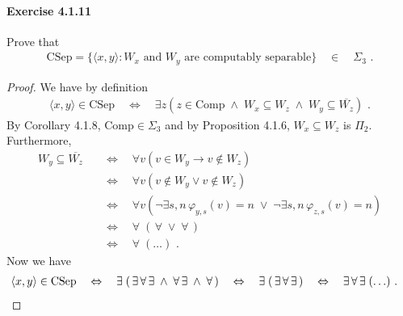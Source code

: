 \documentclass[a4paper,11pt]{article}
\begin{document}
\paragraph{Exercise 4.1.11}

Prove that
\begin{align*}
  \text{CSep} = \{ \langle x, y \rangle : \text{$W_x$ and $W_y$ are computably separable}\} \quad \in \quad \Sigma_3 \text{ .}
\end{align*}
\begin{proof}
We have by definition
\begin{align*}
  \langle x, y \rangle \in \text{CSep} \quad \Leftrightarrow \quad \exists z(z \in \text{Comp} \; \wedge \; W_x \subseteq W_z \; \wedge \; W_y \subseteq \overline{W_z}) \text{ .}
\end{align*}
By Corollary 4.1.8, $\text{Comp} \in \Sigma_3$ and by Proposition 4.1.6, $W_x \subseteq W_z$ is $\Pi_2$.
Furthermore,
\begin{align*}
  W_y \subseteq \overline{W_z} \quad & \Leftrightarrow \quad \forall v(v \in W_y \rightarrow v \notin W_z)\\
  & \Leftrightarrow \quad \forall v(v \notin W_y \vee v \notin W_z)\\
  & \Leftrightarrow \quad \forall v(\neg \exists s,n \, \varphi_{y,s}(v) = n \; \vee \; \neg \exists s,n \, \varphi_{z,s}(v) = n)\\
  & \Leftrightarrow \quad \forall \; ( \, \forall \; \vee \; \forall \, )\\
  & \Leftrightarrow \quad \forall \; ( \ldots ) \text{ .}
\end{align*}
Now we have
\begin{align*}
  & \langle x, y \rangle \in \text{CSep} \quad \Leftrightarrow \quad \exists \; ( \, \exists \, \forall \, \exists \; \wedge \; \forall \, \exists \; \wedge \; \forall \, ) \quad \Leftrightarrow \quad \exists \; ( \, \exists \, \forall \, \exists \, ) \quad \Leftrightarrow \quad \exists \, \forall \, \exists \; (\ldots) \text{ .} \qedhere
\end{align*}


\end{proof}
\end{document}
